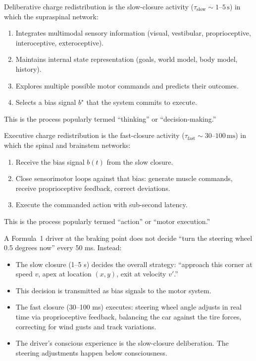 \begin{definition}
Deliberative charge redistribution is the slow-closure activity ($\tau_{\text{slow}} \sim 1\text{--}5\,\text{s}$) in which the supraspinal network:
\begin{enumerate}[label=(\roman*),leftmargin=*,itemsep=1pt]
\item Integrates multimodal sensory information (visual, vestibular, proprioceptive, interoceptive, exteroceptive).
\item Maintains internal state representation (goals, world model, body model, history).
\item Explores multiple possible motor commands and predicts their outcomes.
\item Selects a bias signal $b^{\star}$ that the system commits to execute.
\end{enumerate}
This is the process popularly termed ``thinking'' or ``decision-making.''
\end{definition}

\begin{definition}
Executive charge redistribution is the fast-closure activity ($\tau_{\text{fast}} \sim 30\text{--}100\,\text{ms}$) in which the spinal and brainstem networks:
\begin{enumerate}[label=(\roman*),leftmargin=*,itemsep=1pt]
\item Receive the bias signal $b(t)$ from the slow closure.
\item Close sensorimotor loops against that bias: generate muscle commands, receive proprioceptive feedback, correct deviations.
\item Execute the commanded action with sub-second latency.
\end{enumerate}
This is the process popularly termed ``action'' or ``motor execution.''
\end{definition}

\begin{remark}
A Formula~1 driver at the braking point does not decide ``turn the steering wheel 0.5 degrees now'' every 50 ms. Instead:
\begin{itemize}
\item The slow closure (1--5 s) decides the overall strategy: ``approach this corner at speed $v$, apex at location $(x,y)$, exit at velocity $v'$.''
\item This decision is transmitted as bias signals to the motor system.
\item The fast closure (30--100 ms) executes: steering wheel angle adjusts in real time via proprioceptive feedback, balancing the car against the tire forces, correcting for wind gusts and track variations.
\item The driver's conscious experience is the slow-closure deliberation. The steering adjustments happen below consciousness.
\end{itemize}
\end{remark}

